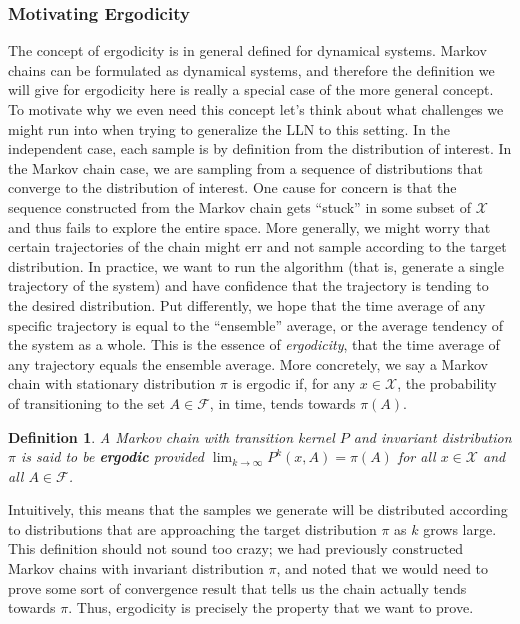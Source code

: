 \documentclass[12pt]{article}
\newtheorem{definition}{Definition}
\begin{document}
\subsubsection{Motivating Ergodicity}
The concept of ergodicity is in general defined for dynamical systems. Markov chains can be formulated as dynamical systems, and therefore the definition we will
give for ergodicity here is really a special case of the more general concept. To motivate why we even need this concept let's think about what challenges we might 
run into when trying to generalize the LLN to this setting. In the independent case, each sample is by definition from the distribution of interest. In the Markov chain case, 
we are sampling from a sequence of distributions that converge to the distribution of interest. One cause for concern is that the sequence constructed from the Markov chain 
gets ``stuck'' in some subset of $\mathcal{X}$ and thus fails to explore the entire space. More generally, we might worry that certain trajectories of the chain might err and 
not sample according to the target distribution. In practice, we want to run the algorithm (that is, generate a single trajectory of the system) and have confidence that the trajectory 
is tending to the desired distribution. Put differently, we hope that the time average of any specific trajectory is equal to the ``ensemble'' average, or the average tendency of the system
as a whole. This is the essence of \textit{ergodicity}, that the time average of any trajectory equals the ensemble average. More concretely, we say a Markov chain with stationary 
distribution $\pi$ is ergodic if, for any $x \in \mathcal{X}$, the probability of transitioning to the set $A \in \mathcal{F}$, in time, tends towards $\pi(A)$. 

\begin{definition}
A Markov chain with transition kernel $P$ and invariant distribution $\pi$ is said to be \textbf{ergodic} provided $\lim_{k \to \infty} P^k(x, A) = \pi(A)$ for all 
$x \in \mathcal{X}$ and all $A \in \mathcal{F}$. 
\end{definition}

Intuitively, this means that the samples we generate will be distributed according to distributions that are approaching the target distribution $\pi$ as $k$ grows large. 
This definition should not sound too crazy; we had previously constructed Markov chains with invariant distribution $\pi$, and noted that we would need to prove some 
sort of convergence result that tells us the chain actually tends towards $\pi$. Thus, ergodicity is precisely the property that we want to prove. 
\end{document}
